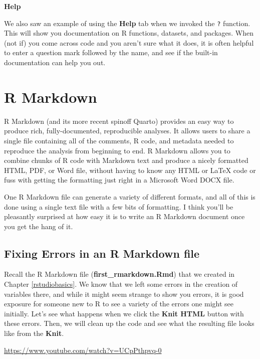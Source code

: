 \documentclass[]{tufte-book}
\begin{document}
\vspace*{0.2in}

\noindent\textbf{Help}\vspace*{0.1in}

We also saw an example of using the \textbf{Help} tab when we invoked the \texttt{?} function. This will show you documentation on R functions, datasets, and packages. When (not if) you come across code and you aren't sure what it does, it is often helpful to enter a question mark followed by the name, and see if the built-in documentation can help you out.

\chapter{R Markdown}\label{rmarkdown}

R Markdown (and its more recent spinoff Quarto) provides an easy way to produce rich, fully-documented, reproducible analyses. It allows users to share a single file containing all of the comments, R code, and metadata needed to reproduce the analysis from beginning to end. R Markdown allows you to combine chunks of R code with Markdown text and produce a nicely formatted HTML, PDF, or Word file, without having to know any HTML or LaTeX code or fuss with getting the formatting just right in a Microsoft Word DOCX file.

One R Markdown file can generate a variety of different formats, and all of this is done using a single text file with a few bits of formatting. I think you'll be pleasantly surprised at how easy it is to write an R Markdown document once you get the hang of it.

\section{Fixing Errors in an R Markdown file}\label{fixerrors}

Recall the R Markdown file (\textbf{first\_rmarkdown.Rmd}) that we created in Chapter \ref{rstudiobasics}. We know that we left some errors in the creation of variables there, and while it might seem strange to show you errors, it is good exposure for someone new to R to see a variety of the errors one might see initially. Let's see what happens when we click the \textbf{Knit HTML} button with these errors. Then, we will clean up the code and see what the resulting file looks like from the \textbf{Knit}.

\vspace{0.1in}\begin{center}\footnotesize{\url{https://www.youtube.com/watch?v=UCpPthpvq-0}}\end{center}\vspace{0.1in}
\end{document}
